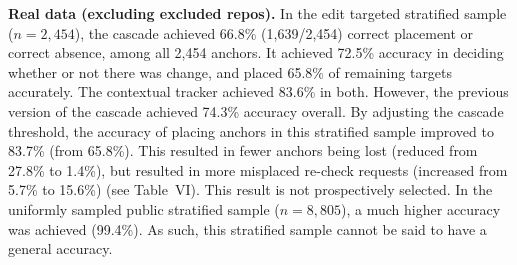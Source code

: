 \documentclass[10pt,conference,letterpaper]{IEEEtran}
\begin{document}
\textbf{Real data (excluding excluded repos).} In the edit targeted stratified sample ($n=2,454$), the cascade achieved 66.8\% (1,639/2,454) correct placement or correct absence, among all 2,454 anchors. It achieved 72.5\% accuracy in deciding whether or not there was change, and placed 65.8\% of remaining targets accurately. The contextual tracker achieved 83.6\% in both. However, the previous version of the cascade achieved 74.3\% accuracy overall. By adjusting the cascade threshold, the accuracy of placing anchors in this stratified sample improved to 83.7\% (from 65.8\%). This resulted in fewer anchors being lost (reduced from 27.8\% to 1.4\%), but resulted in more misplaced re-check requests (increased from 5.7\% to 15.6\%) (see Table~VI). This result is not prospectively selected. In the uniformly sampled public stratified sample ($n=8,805$), a much higher accuracy was achieved (99.4\%). As such, this stratified sample cannot be said to have a general accuracy.
\end{document}
